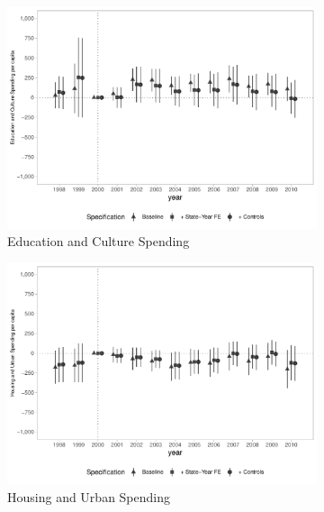 \begin{figure}[h]
\begin{center}
\begin{subfigure}{0.32\textwidth}
    \end{subfigure}
    \begin{subfigure}{0.32\textwidth}
        \centering
        \caption{\scriptsize Education and Culture Spending}\label{fig:finbra3_c}
        \includegraphics[width=\textwidth]{plots/spending/finbra_desp_educ_cultura_pcapita_dist_ec29_baseline_dist_ec29_baseline_full.pdf}
    \end{subfigure}
    \begin{subfigure}{0.32\textwidth}
        \centering
        \caption{\scriptsize Housing and Urban Spending}\label{fig:finbr3_d}
        \includegraphics[width=\textwidth]{plots/spending/finbra_desp_hab_urb_pcapita_dist_ec29_baseline_dist_ec29_baseline_full.pdf}
    \end{subfigure}
    \begin{subfigure}{0.32\textwidth}

\end{subfigure}
\end{center}
\end{figure}
